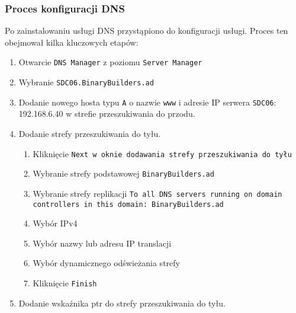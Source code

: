 \clearpage
{}
\clearpage

\clearpage
{}


\subsubsection{Proces konfiguracji DNS}
Po zainstalowaniu usługi DNS przystąpiono do konfiguracji usługi. Proces ten obejmował kilka kluczowych etapów:

\begin{enumerate}
	\item Otwarcie \texttt{DNS Manager} z poziomu \texttt{Server Manager} 
	\item Wybranie \texttt{SDC06.BinaryBuilders.ad} 
	\item Dodanie nowego hosta typu \texttt{A} o nazwie \texttt{www} i adresie IP serwera \texttt{SDC06}: 192.168.6.40 w strefie przeszukiwania do przodu. 
	\item Dodanie strefy przeszukiwania do tyłu. 
	\begin {enumerate}
	\item Kliknięcie \texttt{Next w oknie dodawania strefy przeszukiwania do tyłu} 
	\item Wybranie strefy podstawowej \texttt{BinaryBuilders.ad} 
	\item Wybranie strefy replikacji \texttt{To all DNS servers running on domain controllers in this domain: BinaryBuilders.ad} 
	\item Wybór IPv4 
	\item Wybór nazwy lub adresu IP translacji 
	\item Wybór dynamicznego odświeżania strefy 
	\item Kliknięcie \texttt{Finish} 
	\end{enumerate}
	\item Dodanie wskaźnika ptr do strefy przeszukiwania do tyłu. 
\end{enumerate}

